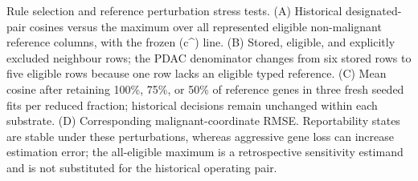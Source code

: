 Rule selection and reference perturbation stress tests. (A) Historical designated-pair cosines versus the maximum over all represented eligible non-malignant reference columns, with the frozen (c^) line. (B) Stored, eligible, and explicitly excluded neighbour rows; the PDAC denominator changes from six stored rows to five eligible rows because one row lacks an eligible typed reference. (C) Mean cosine after retaining 100\%, 75\%, or 50\% of reference genes in three fresh seeded fits per reduced fraction; historical decisions remain unchanged within each substrate. (D) Corresponding malignant-coordinate RMSE. Reportability states are stable under these perturbations, whereas aggressive gene loss can increase estimation error; the all-eligible maximum is a retrospective sensitivity estimand and is not substituted for the historical operating pair.
